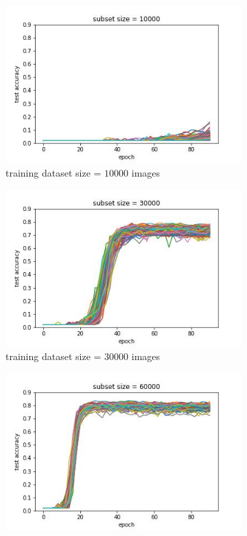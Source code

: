\documentclass{article} %
\begin{document}
\begin{figure}
    \begin{subfigure}{.5\textwidth}
        \centering
        \includegraphics[width=.8\linewidth]{emnist/test_acc_vs_epoch_subset_size_10000.jpg}
        \caption{training dataset size = $10000$ images}
        \label{fig:subsetsize5000}
    \end{subfigure}%
    \begin{subfigure}{.5\textwidth}
        \centering
        \includegraphics[width=.8\linewidth]{emnist/test_acc_vs_epoch_subset_size_30000.jpg}
        \caption{training dataset size = $30000$ images}
        \label{fig:subsetsize20000}
    \end{subfigure}
    \begin{subfigure}{.5\textwidth}
        \centering
        \includegraphics[width=.8\linewidth]{emnist/test_acc_vs_epoch_subset_size_60000.jpg}

\end{subfigure}
\end{figure}
\end{document}
